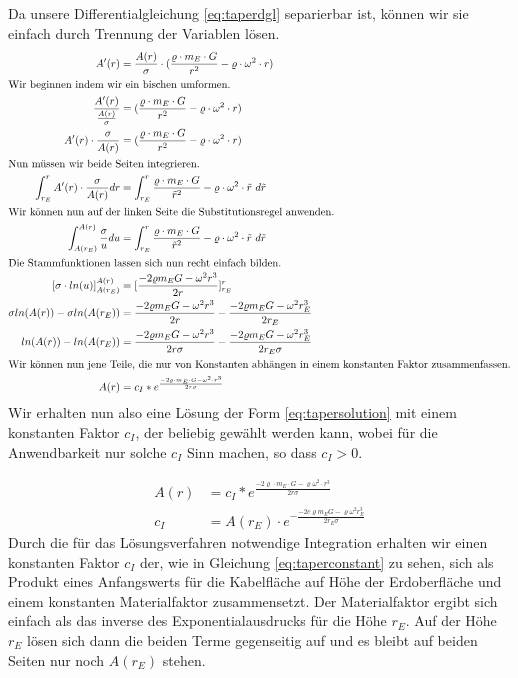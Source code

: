 \documentclass[a4paper, 10pt]{report}
\begin{document}
Da unsere Differentialgleichung \ref{eq:taperdgl} separierbar ist, können wir sie einfach durch Trennung der Variablen lösen.
\begin{align*}
A'(r) &= \frac{A(r)}{\sigma} \cdot (\frac{\varrho\cdot m_E \cdot G}{r^2} - \varrho \cdot \omega^2 \cdot r)\\
\intertext{Wir beginnen indem wir ein bischen umformen.}
\frac{A'(r)}{\frac{A(r)}{\sigma}} &= (\frac{\varrho\cdot m_E \cdot G}{r^2} - \varrho \cdot \omega^2 \cdot r)\\
A'(r) \cdot \frac{\sigma}{A(r)} &= (\frac{\varrho\cdot m_E \cdot G}{r^2} - \varrho \cdot \omega^2 \cdot r)\\
\intertext{Nun müssen wir beide Seiten integrieren.}
\int_{r_E}^{r} A'(r) \cdot \frac{\sigma}{A(r)} dr &=  \int_{r_E}^{r} \frac{\varrho\cdot m_E \cdot G}{\tilde{r}^2} - \varrho \cdot \omega^2 \cdot \tilde{r} \ d\tilde{r}\\
\intertext{Wir können nun auf der linken Seite die Substitutionsregel anwenden.}
\int_{A(r_E)}^{A(r)} \frac{\sigma}{u} du &=  \int_{r_E}^{r} \frac{\varrho\cdot m_E \cdot G}{\tilde{r}^2} - \varrho \cdot \omega^2 \cdot \tilde{r} \ d\tilde{r}\\
\intertext{Die Stammfunktionen lassen sich nun recht einfach bilden.}
[\sigma \cdot ln(u)]_{A(r_E)}^{A(r)} &=  [\frac{-2\varrho m_E G - \omega^2 r^3}{2 r}]_{r_E}^{r}\\
\sigma ln(A(r)) - \sigma ln(A(r_E)) &= \frac{-2\varrho m_E G - \omega^2 r^3}{2 r} - \frac{-2\varrho m_E G - \omega^2 r_E^3}{2 r_E}\\
ln(A(r)) - ln(A(r_E)) &= \frac{-2\varrho m_E G - \omega^2 r^3}{2 r \sigma} - \frac{-2\varrho m_E G - \omega^2 r_E^3}{2 r_E \sigma}\\
\intertext{Wir können nun jene Teile, die nur von Konstanten abhängen in einem konstanten Faktor zusammenfassen.}
A(r) &= c_I * e^{\frac{-2\varrho \cdot m_E \cdot G - \omega^2 \cdot r^3}{2 r \sigma}}
\end{align*}
Wir erhalten nun also eine Lösung der Form \ref{eq:tapersolution} mit einem konstanten Faktor $c_I$, der beliebig gewählt werden kann, wobei für die Anwendbarkeit nur solche $c_I$ Sinn machen, so dass $c_I>0$.

\begin{align}
A(r) &= c_I * e^{\frac{-2\varrho \cdot m_E \cdot G - \varrho \omega^2 \cdot r^3}{2 r \sigma}}\label{eq:tapersolution}\\
c_I &= A(r_E) \cdot e^{-\frac{-2 c \varrho m_E G - \varrho \omega^2 r_E^3}{2 r_E \sigma}}
\label{eq:taperconstant}
\end{align}
Durch die für das Lösungsverfahren notwendige Integration erhalten wir einen konstanten Faktor $c_I$ der, wie in Gleichung \ref{eq:taperconstant} zu sehen, sich als Produkt eines Anfangswerts für die Kabelfläche auf Höhe der Erdoberfläche und einem konstanten Materialfaktor zusammensetzt. Der Materialfaktor ergibt sich einfach als das inverse des Exponentialausdrucks für die Höhe $r_E$. Auf der Höhe $r_E$ lösen sich dann die beiden Terme gegenseitig auf und es bleibt auf beiden Seiten nur noch $A(r_E)$ stehen.
\end{document}
